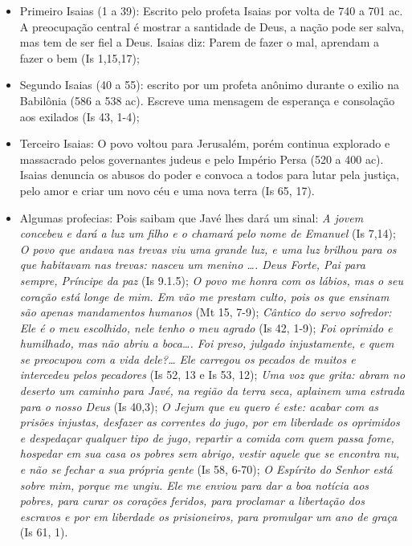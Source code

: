 \documentclass[
]{book}
\begin{document}
\begin{itemize}
\item
  Primeiro Isaias (1 a 39): Escrito pelo profeta Isaias por volta de 740 a 701 ac. A preocupação central é mostrar a santidade de Deus, a nação pode ser salva, mas tem de ser fiel a Deus. Isaias diz: Parem de fazer o mal, aprendam a fazer o bem (Is 1,15,17);
\item
  Segundo Isaias (40 a 55): escrito por um profeta anônimo durante o exilio na Babilônia (586 a 538 ac). Escreve uma mensagem de esperança e consolação aos exilados (Is 43, 1-4);
\item
  Terceiro Isaias: O povo voltou para Jerusalém, porém continua explorado e massacrado pelos governantes judeus e pelo Império Persa (520 a 400 ac). Isaias denuncia os abusos do poder e convoca a todos para lutar pela justiça, pelo amor e criar um novo céu e uma nova terra (Is 65, 17).
\item
  Algumas profecias: Pois saibam que Javé lhes dará um sinal: \emph{A jovem concebeu e dará a luz um filho e o chamará pelo nome de Emanuel} (Is 7,14); \emph{O povo que andava nas trevas viu uma grande luz, e uma luz brilhou para os que habitavam nas trevas: nasceu um menino \ldots. Deus Forte, Pai para sempre, Príncipe da paz} (Is 9.1.5); \emph{O povo me honra com os lábios, mas o seu coração está longe de mim. Em vão me prestam culto, pois os que ensinam são apenas mandamentos humanos} (Mt 15, 7-9); \emph{Cântico do servo sofredor: Ele é o meu escolhido, nele tenho o meu agrado} (Is 42, 1-9); \emph{Foi oprimido e humilhado, mas não abriu a boca\ldots. Foi preso, julgado injustamente, e quem se preocupou com a vida dele?\ldots{} Ele carregou os pecados de muitos e intercedeu pelos pecadores} (Is 52, 13 e Is 53, 12); \emph{Uma voz que grita: abram no deserto um caminho para Javé, na região da terra seca, aplainem uma estrada para o nosso Deus} (Is 40,3); \emph{O Jejum que eu quero é este: acabar com as prisões injustas, desfazer as correntes do jugo, por em liberdade os oprimidos e despedaçar qualquer tipo de jugo, repartir a comida com quem passa fome, hospedar em sua casa os pobres sem abrigo, vestir aquele que se encontra nu, e não se fechar a sua própria gente} (Is 58, 6-70); \emph{O Espírito do Senhor está sobre mim, porque me ungiu. Ele me enviou para dar a boa notícia aos pobres, para curar os corações feridos, para proclamar a libertação dos escravos e por em liberdade os prisioneiros, para promulgar um ano de graça} (Is 61, 1).
\end{itemize}
\end{document}
